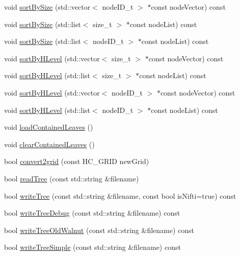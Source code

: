\begin{DoxyCompactItemize}
\item 
void \hyperlink{classWHtree_ac335b37b8a0a26b9374e76535ac01c94}{sort\-By\-Size} (std\-::vector$<$ node\-I\-D\-\_\-t $>$ $\ast$const node\-Vector) const 
\item 
void \hyperlink{classWHtree_aeda84a0333ad08114f1403a380263188}{sort\-By\-Size} (std\-::list$<$ size\-\_\-t $>$ $\ast$const node\-List) const 
\item 
void \hyperlink{classWHtree_a4e9421fbe40ad68332457c7ad7ec1f1a}{sort\-By\-Size} (std\-::list$<$ node\-I\-D\-\_\-t $>$ $\ast$const node\-List) const 
\item 
void \hyperlink{classWHtree_a9513c31ac9cf391009d7dcda6aa96b0d}{sort\-By\-H\-Level} (std\-::vector$<$ size\-\_\-t $>$ $\ast$const node\-Vector) const 
\item 
void \hyperlink{classWHtree_a3b9f8ca446fce05d2b6d3503995a46e4}{sort\-By\-H\-Level} (std\-::list$<$ size\-\_\-t $>$ $\ast$const node\-List) const 
\item 
void \hyperlink{classWHtree_afeb0ff1c414bbb5f4ca929efc384e6b5}{sort\-By\-H\-Level} (std\-::vector$<$ node\-I\-D\-\_\-t $>$ $\ast$const node\-Vector) const 
\item 
void \hyperlink{classWHtree_a2598f2fcb0bfabd171f9859f51a2c0dc}{sort\-By\-H\-Level} (std\-::list$<$ node\-I\-D\-\_\-t $>$ $\ast$const node\-List) const 
\item 
void \hyperlink{classWHtree_a0f338c613960d45d80f6330dddbbb074}{load\-Contained\-Leaves} ()
\item 
void \hyperlink{classWHtree_a9ba656617bb3102c20f0771afa42bf04}{clear\-Contained\-Leaves} ()
\item 
bool \hyperlink{classWHtree_adbb0438fc5e1f0093a123a0e5c702888}{convert2grid} (const \-H\-C\-\_\-\-G\-R\-I\-D new\-Grid)
\item 
bool \hyperlink{classWHtree_aec015736c955a615f6b610f9a639309a}{read\-Tree} (const std\-::string \&filename)
\item 
bool \hyperlink{classWHtree_aba706369b101c3f42cd7a48e93ca8f54}{write\-Tree} (const std\-::string \&filename, const bool is\-Nifti=true) const 
\item 
bool \hyperlink{classWHtree_a224a9ec0a9e14105404a393d9f42fc2b}{write\-Tree\-Debug} (const std\-::string \&filename) const 
\item 
bool \hyperlink{classWHtree_a3e7b5ac0129cfef78438c037c8793cd8}{write\-Tree\-Old\-Walnut} (const std\-::string \&filename) const 
\item 
bool \hyperlink{classWHtree_a3deb538945b6e294e79d7e3faf264423}{write\-Tree\-Simple} (const std\-::string \&filename) const 

\end{DoxyCompactItemize}
